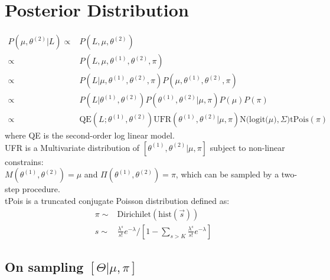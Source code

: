 \documentclass[11 pt, a4paper]{article}  %
\begin{document}
\section{Posterior Distribution}
\begin{align*}
P(\mu, \theta^{(2)} |L) \propto & P(L, \mu, \theta^{(2)}) \\
\propto &  P(L, \mu ,\theta^{(1)},\theta^{(2)},\pi) \\
\propto & P(L | \mu, \theta^{(1)},\theta^{(2)},\pi) P(\mu, \theta^{(1)},\theta^{(2)},\pi)\\
\propto & P(L | \theta^{(1)},\theta^{(2)}) P(\theta^{(1)},\theta^{(2)} |\mu, \pi ) P(\mu) P(\pi)\\
\propto & \text{QE}(L; \theta^{(1)},\theta^{(2)}) \text{UFR}(\theta^{(1)},\theta^{(2)} |\mu, \pi ) \text{N(logit(}\mu),\Sigma) \text{tPois}(\pi)
\end{align*}
where QE is the second-order log linear model.\\
UFR is a Multivariate distribution of $[\theta^{(1)},\theta^{(2)}|\mu, \pi]$ subject to non-linear constrains:\\
 $M( \theta^{(1)},\theta^{(2)}) =\mu$ and $\Pi (\theta^{(1)},\theta^{(2)}) = \pi$, which can be sampled by a two-step procedure.\\
tPois is a truncated conjugate Poisson distribution defined as:
\begin{align*}
\pi \sim & \text{Dirichilet}(\text{hist}(\vec{s}))\\
s \sim & \frac{\lambda^s}{s!}e^{-\lambda}/[1- \sum_{s>K}\frac{\lambda^s}{s!}e^{-\lambda}]
\end{align*}

\subsection{On sampling $[\Theta |\mu, \pi]$}
\end{document}
